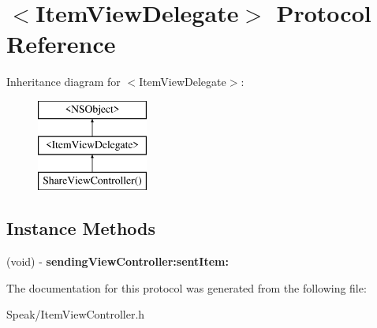 \hypertarget{protocol_item_view_delegate-p}{}\section{$<$Item\+View\+Delegate$>$ Protocol Reference}
\label{protocol_item_view_delegate-p}
Inheritance diagram for $<$Item\+View\+Delegate$>$\+:\begin{figure}[H]
\begin{center}
\leavevmode
\includegraphics[height=3.000000cm]{protocol_item_view_delegate-p}
\end{center}
\end{figure}
\subsection*{Instance Methods}
\begin{DoxyCompactItemize}
\item 
\hypertarget{protocol_item_view_delegate-p_add19ac9ab91acd2132a8225acbed4f00}{}(void) -\/ {\bfseries sending\+View\+Controller\+:sent\+Item\+:}\label{protocol_item_view_delegate-p_add19ac9ab91acd2132a8225acbed4f00}

\end{DoxyCompactItemize}


The documentation for this protocol was generated from the following file\+:\begin{DoxyCompactItemize}
\item 
Speak/Item\+View\+Controller.\+h\end{DoxyCompactItemize}
